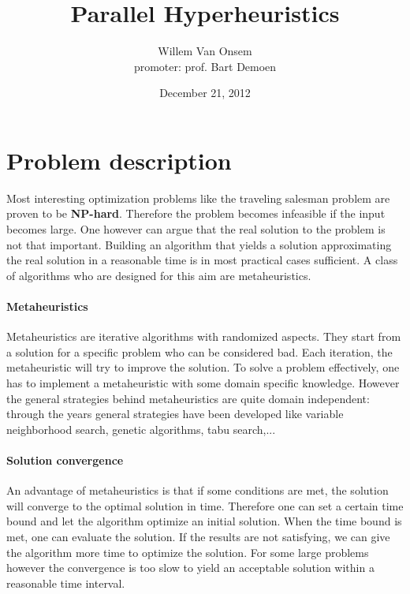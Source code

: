 \documentclass{IEEEconf}
\title{Parallel Hyperheuristics}
\author{Willem Van Onsem\\promoter: prof. Bart Demoen}
\date{December 21, 2012}
\newcommand{\npc}{\textbf{NP-hard}}
\begin{document}
\maketitle
\section{Problem description}
Most interesting optimization problems like the traveling salesman problem are proven to be \npc{}. Therefore the problem becomes infeasible if the input becomes large. One however can argue that the real solution to the problem is not that important. Building an algorithm that yields a solution approximating the real solution in a reasonable time is in most practical cases sufficient. A class of algorithms who are designed for this aim are metaheuristics.
\paragraph{Metaheuristics}
Metaheuristics are iterative algorithms with randomized aspects. They start from a solution for a specific problem who can be considered bad. Each iteration, the metaheuristic will try to improve the solution. To solve a problem effectively, one has to implement a metaheuristic with some domain specific knowledge. However the general strategies behind metaheuristics are quite domain independent: through the years general strategies have been developed like variable neighborhood search, genetic algorithms, tabu search,...
\paragraph{Solution convergence}
An advantage of metaheuristics is that if some conditions are met, the solution will converge to the optimal solution in time. Therefore one can set a certain time bound and let the algorithm optimize an initial solution. When the time bound is met, one can evaluate the solution. If the results are not satisfying, we can give the algorithm more time to optimize the solution. For some large problems however the convergence is too slow to yield an acceptable solution within a reasonable time interval.
\end{document}
